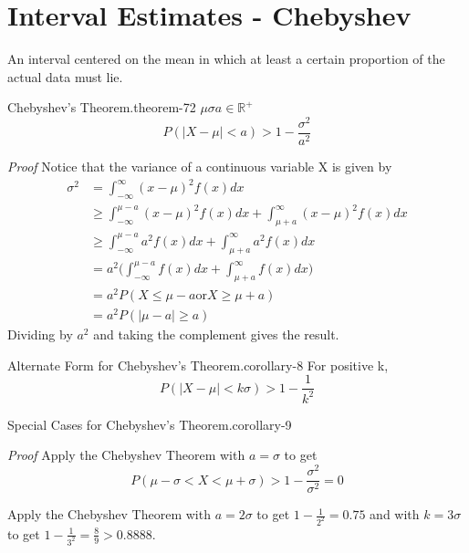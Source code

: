 \documentclass[10pt,]{book}
\makeatletter
\renewcommand*{\proofname}{Proof}
\renewenvironment{proof}[1][\proofname]{\par
  \pushQED{\qed}%
  \normalfont \topsep6\p@\@plus6\p@\relax
  \trivlist
  \item\relax
    {\itshape
    #1\@addpunct{.}}\hspace\labelsep\ignorespaces
}{%
  \popQED\endtrivlist\@endpefalse
}
\numberwithin{equation}{section}
\newcommand{\lt}{<}
\newcommand{\gt}{>}
\makeatother
\begin{document}
\section[{Interval Estimates - Chebyshev}]{Interval Estimates - Chebyshev}\label{section-66}
\hypertarget{p-1320}{}%
An interval centered on the mean in which at least a certain proportion of the actual data must lie.%
\begin{theorem}{Chebyshev's Theorem.}{}{theorem-72}%
\(\mu\)\(\sigma\)\(a \in \mathbb{R}^+\)%
\begin{equation*}
P( \big | X - \mu \big | \lt a ) \gt 1 - \frac{\sigma^2}{a^2}
\end{equation*}
\end{theorem}
\begin{proof}\hypertarget{proof-71}{}
\hypertarget{p-1321}{}%
Notice that the variance of a continuous variable X is given by%
\begin{align*}
\sigma^2 & = \int_{-\infty}^{\infty} (x - \mu)^2 f(x) dx\\
& \ge \int_{-\infty}^{\mu-a} (x - \mu)^2 f(x) dx + \int_{\mu + a}^{\infty} (x - \mu)^2 f(x) dx\\
& \ge \int_{-\infty}^{\mu-a} a^2 f(x) dx + \int_{\mu + a}^{\infty} a^2 f(x) dx\\
& = a^2 \big ( \int_{-\infty}^{\mu-a} f(x) dx + \int_{\mu + a}^{\infty} f(x) dx \big )\\
& = a^2 P( X \le \mu - a \text{or} X \ge \mu + a )\\
& = a^2 P( \big | \mu - a \big | \ge a)
\end{align*}
Dividing by \(a^2\) and taking the complement gives the result.%
\end{proof}
\begin{corollary}{Alternate Form for Chebyshev's Theorem.}{}{corollary-8}%
\hypertarget{p-1322}{}%
For positive k,%
\begin{equation*}
P( \big | X - \mu \big | \lt k \sigma ) \gt 1 - \frac{1}{k^2}
\end{equation*}
%
\end{corollary}
\begin{corollary}{Special Cases for Chebyshev's Theorem.}{}{corollary-9}%
\end{corollary}
\begin{proof}\hypertarget{proof-72}{}
\hypertarget{p-1323}{}%
Apply the Chebyshev Theorem with \(a = \sigma\) to get%
\begin{equation*}
P(\mu - \sigma \lt X \lt \mu + \sigma) \gt 1 - \frac{\sigma^2}{\sigma^2} = 0
\end{equation*}
%
\par
\hypertarget{p-1324}{}%
Apply the Chebyshev Theorem with \(a = 2 \sigma\) to get \(1 - \frac{1}{2^2} = 0.75\) and with \(k = 3 \sigma\) to get \(1 - \frac{1}{3^2} = \frac{8}{9} > 0.8888\).%
\end{proof}
\end{document}
